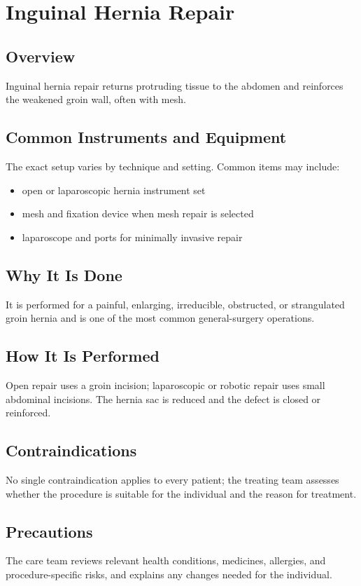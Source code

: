 \chapter{Inguinal Hernia Repair}
\section*{Overview}
Inguinal hernia repair returns protruding tissue to the abdomen and reinforces the weakened groin wall, often with mesh.
\section*{Common Instruments and Equipment}
The exact setup varies by technique and setting. Common items may include:
\begin{itemize}[nosep,leftmargin=*]
  \item open or laparoscopic hernia instrument set
  \item mesh and fixation device when mesh repair is selected
  \item laparoscope and ports for minimally invasive repair
\end{itemize}

\section*{Why It Is Done}
It is performed for a painful, enlarging, irreducible, obstructed, or strangulated groin hernia and is one of the most common general-surgery operations.
\section*{How It Is Performed}
Open repair uses a groin incision; laparoscopic or robotic repair uses small abdominal incisions. The hernia sac is reduced and the defect is closed or reinforced.
\section*{Contraindications}
No single contraindication applies to every patient; the treating team assesses whether the procedure is suitable for the individual and the reason for treatment.

\section*{Precautions}
The care team reviews relevant health conditions, medicines, allergies, and procedure-specific risks, and explains any changes needed for the individual.

